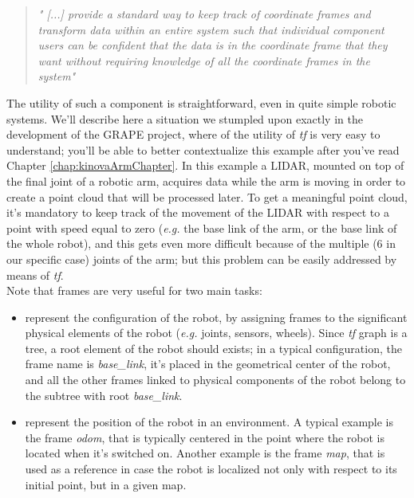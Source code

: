 \blockquote{
\textit{" [...] provide a standard way to keep track of coordinate frames and transform data within an entire system such that individual component users can be confident that the data is in the coordinate frame that they want without requiring knowledge of all the coordinate
frames in the system" \parencite{tfPaper}}
}
The utility of such a component is straightforward, even in quite simple robotic systems. We'll describe here a situation we stumpled upon exactly in the development of the \ac{GRAPE} project, where of the utility of \textit{tf} is very easy to understand; you'll be able to better contextualize this example after you've read Chapter \ref{chap:kinovaArmChapter}. In this example a \ac{LIDAR}, mounted on top of the final joint of a robotic arm, acquires data while the arm is moving in order to create a point cloud that will be processed later. To get a meaningful point cloud, it's mandatory to keep track of the movement of the \ac{LIDAR} with respect to a point with speed equal to zero (\textit{e.g.} the base link of the arm, or the base link of the whole robot), and this gets even more difficult because of the multiple (6 in our specific case) joints of the arm; but this problem can be easily addressed by means of \textit{tf}.\\
Note that frames are very useful for two main tasks:
\begin{itemize}
	\item represent the configuration of the robot, by assigning frames to the significant physical elements of the robot (\textit{e.g.} joints, sensors, wheels). Since \textit{tf} graph is a tree, a root element of the robot should exists; in a typical configuration, the frame name is \textit{base\_link}, it's placed in the geometrical center of the robot, and all the other frames linked to physical components of the robot belong to the subtree with root \textit{base\_link}.
	\item represent the position of the robot in an environment. A typical example is the frame \textit{odom}, that is typically centered in the point where the robot is located when it's switched on. Another example is the frame \textit{map}, that is used as a reference in case the robot is localized not only with respect to its initial point, but in a given map.
\end{itemize}


